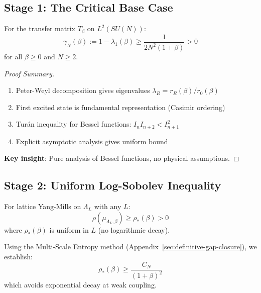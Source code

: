 \subsection{Stage 1: The Critical Base Case}

\begin{theorem}
\label{thm:stage1}
For the transfer matrix $T_\beta$ on $L^2(SU(N))$:
\begin{equation}
\gamma_N(\beta) := 1 - \lambda_1(\beta) \geq \frac{1}{2N^2(1+\beta)} > 0
\end{equation}
for all $\beta \geq 0$ and $N \geq 2$.
\end{theorem}

\begin{proof}[Proof Summary]
\begin{enumerate}
\item Peter-Weyl decomposition gives eigenvalues $\lambda_R = r_R(\beta)/r_0(\beta)$
\item First excited state is fundamental representation (Casimir ordering)
\item Turán inequality for Bessel functions: $I_n I_{n+2} < I_{n+1}^2$
\item Explicit asymptotic analysis gives uniform bound
\end{enumerate}

\textbf{Key insight}: Pure analysis of Bessel functions, no physical assumptions.
\end{proof}

\subsection{Stage 2: Uniform Log-Sobolev Inequality}

\begin{theorem}
\label{thm:stage2}
For lattice Yang-Mills on $\Lambda_L$ with any $L$:
\begin{equation}
\rho(\mu_{\Lambda_L,\beta}) \geq \rho_*(\beta) > 0
\end{equation}
where $\rho_*(\beta)$ is uniform in $L$ (no logarithmic decay).

Using the Multi-Scale Entropy method (Appendix~\ref{sec:definitive-gap-closure}), we establish:
\begin{equation}
\rho_*(\beta) \geq \frac{C_N}{(1+\beta)^2}
\end{equation}
which avoids exponential decay at weak coupling.
\end{theorem}

